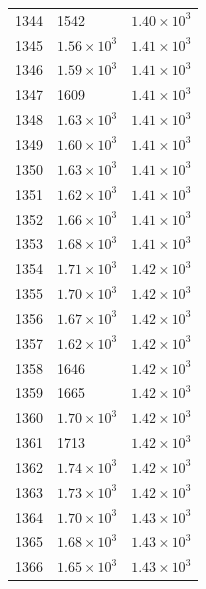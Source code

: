 \begin{table}[H]
\begin{tabular}{lll}
1344 & 1542 & $\displaystyle 1.40 \times 10^{3}$ \\
1345 & $\displaystyle 1.56 \times 10^{3}$ & $\displaystyle 1.41 \times 10^{3}$ \\
1346 & $\displaystyle 1.59 \times 10^{3}$ & $\displaystyle 1.41 \times 10^{3}$ \\
1347 & 1609 & $\displaystyle 1.41 \times 10^{3}$ \\
1348 & $\displaystyle 1.63 \times 10^{3}$ & $\displaystyle 1.41 \times 10^{3}$ \\
1349 & $\displaystyle 1.60 \times 10^{3}$ & $\displaystyle 1.41 \times 10^{3}$ \\
1350 & $\displaystyle 1.63 \times 10^{3}$ & $\displaystyle 1.41 \times 10^{3}$ \\
1351 & $\displaystyle 1.62 \times 10^{3}$ & $\displaystyle 1.41 \times 10^{3}$ \\
1352 & $\displaystyle 1.66 \times 10^{3}$ & $\displaystyle 1.41 \times 10^{3}$ \\
1353 & $\displaystyle 1.68 \times 10^{3}$ & $\displaystyle 1.41 \times 10^{3}$ \\
1354 & $\displaystyle 1.71 \times 10^{3}$ & $\displaystyle 1.42 \times 10^{3}$ \\
1355 & $\displaystyle 1.70 \times 10^{3}$ & $\displaystyle 1.42 \times 10^{3}$ \\
1356 & $\displaystyle 1.67 \times 10^{3}$ & $\displaystyle 1.42 \times 10^{3}$ \\
1357 & $\displaystyle 1.62 \times 10^{3}$ & $\displaystyle 1.42 \times 10^{3}$ \\
1358 & 1646 & $\displaystyle 1.42 \times 10^{3}$ \\
1359 & 1665 & $\displaystyle 1.42 \times 10^{3}$ \\
1360 & $\displaystyle 1.70 \times 10^{3}$ & $\displaystyle 1.42 \times 10^{3}$ \\
1361 & 1713 & $\displaystyle 1.42 \times 10^{3}$ \\
1362 & $\displaystyle 1.74 \times 10^{3}$ & $\displaystyle 1.42 \times 10^{3}$ \\
1363 & $\displaystyle 1.73 \times 10^{3}$ & $\displaystyle 1.42 \times 10^{3}$ \\
1364 & $\displaystyle 1.70 \times 10^{3}$ & $\displaystyle 1.43 \times 10^{3}$ \\
1365 & $\displaystyle 1.68 \times 10^{3}$ & $\displaystyle 1.43 \times 10^{3}$ \\
1366 & $\displaystyle 1.65 \times 10^{3}$ & $\displaystyle 1.43 \times 10^{3}$ \\

\end{tabular}
\end{table}

